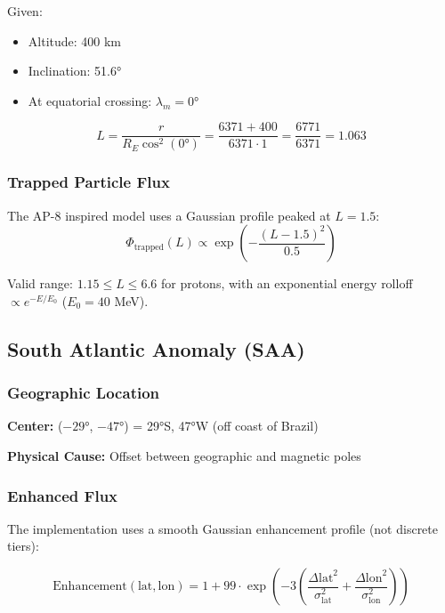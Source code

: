 \documentclass[11pt,a4paper]{article}
\begin{document}
Given:
\begin{itemize}
    \item Altitude: 400 km
    \item Inclination: 51.6°
    \item At equatorial crossing: $\lambda_m = 0°$
\end{itemize}

\begin{equation}
L = \frac{r}{R_E \cos^2(0°)} = \frac{6371 + 400}{6371 \cdot 1} = \frac{6771}{6371} = 1.063
\end{equation}

\subsubsection{Trapped Particle Flux}

The AP-8 inspired model uses a Gaussian profile peaked at $L = 1.5$:
\begin{equation}
\Phi_{\text{trapped}}(L) \propto \exp\!\left(-\frac{(L - 1.5)^2}{0.5}\right)
\end{equation}

Valid range: $1.15 \leq L \leq 6.6$ for protons, with an exponential energy rolloff $\propto e^{-E/E_0}$ ($E_0 = 40$ MeV).

\subsection{South Atlantic Anomaly (SAA)}

\subsubsection{Geographic Location}

\textbf{Center:} ($-29°$, $-47°$) = 29°S, 47°W (off coast of Brazil)

\textbf{Physical Cause:} Offset between geographic and magnetic poles

\subsubsection{Enhanced Flux}

The implementation uses a smooth Gaussian enhancement profile (not discrete tiers):

\begin{equation}
\text{Enhancement}(\text{lat}, \text{lon}) = 1 + 99 \cdot \exp\!\left(-3\left(\frac{\Delta\text{lat}^2}{\sigma_{\text{lat}}^2} + \frac{\Delta\text{lon}^2}{\sigma_{\text{lon}}^2}\right)\right)
\end{equation}
\end{document}
